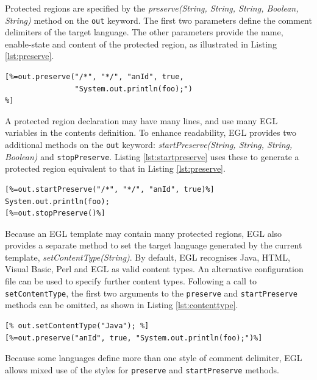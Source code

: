 Protected regions are specified by the \emph{preserve(String, String,
  String, Boolean, String)} method on the \verb|out| keyword. The first two parameters define the comment delimiters
of the target language. The other parameters provide the name,
enable-state and content of the protected region, as
illustrated in Listing \ref{lst:preserve}.

\begin{lstlisting}[basicstyle=\ttfamily\footnotesize, tabsize=2, flexiblecolumns=true, caption=Protected region declaration using the preserve method., label=lst:preserve]
[%=out.preserve("/*", "*/", "anId", true,
                "System.out.println(foo);")
%]
\end{lstlisting}

A protected region declaration may have many lines, and use many EGL
variables in the contents definition.  To enhance readability, EGL
provides two additional methods on the \verb|out| keyword:
\emph{startPreserve(String, String, String, Boolean)} and
\verb|stopPreserve|.  Listing \ref{lst:startpreserve} uses these to
generate a protected region equivalent to that in Listing
\ref{lst:preserve}.

\begin{lstlisting}[basicstyle=\ttfamily\footnotesize, tabsize=2, flexiblecolumns=true, caption=Protected region declaration., label=lst:startpreserve]
[%=out.startPreserve("/*", "*/", "anId", true)%]
System.out.println(foo);
[%=out.stopPreserve()%]
\end{lstlisting}

Because an EGL template may contain many protected regions, EGL also
provides a separate method to set the target language generated by the
current template, \emph{setContentType(String)}. By default, EGL recognises Java, HTML, Visual Basic,
Perl and EGL as valid content types. An alternative configuration file
can be used to specify further content
types. Following a call to \verb|setContentType|, the first two
arguments to the \verb|preserve| and \verb|startPreserve| methods can
be omitted, as shown in Listing \ref{lst:contenttype}.

\begin{lstlisting}[basicstyle=\ttfamily\footnotesize, tabsize=2, flexiblecolumns=true, caption=Setting the content type., label=lst:contenttype]
[% out.setContentType("Java"); %]
[%=out.preserve("anId", true, "System.out.println(foo);")%]
\end{lstlisting}

Because some languages define more than one style of comment
delimiter, EGL allows mixed use of  the styles for \verb|preserve| and
\verb|startPreserve| methods.

